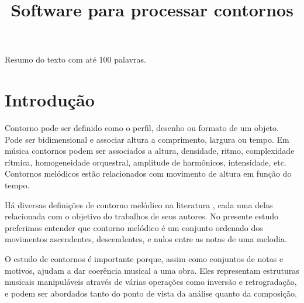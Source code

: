 \documentclass[brazil]{article}
\begin{document}
\graphicspath{{figs/}{out/}{data/}}

\title{Software para processar contornos}
\author{}{}{}{}

\begin{sumario}
  Resumo do texto com até 100 palavras.  
\end{sumario}








\section{Introdução}
\label{sec:introducao}

Contorno pode ser definido como o perfil, desenho ou formato de um
objeto. Pode ser bidimensional e associar altura a comprimento,
largura ou tempo. Em música contornos podem ser associados a altura,
densidade, ritmo, complexidade rítmica, homogeneidade orquestral,
amplitude de harmônicos, intensidade, etc. Contornos melódicos estão
relacionados com movimento de altura em função do tempo.

Há diversas definições de contorno melódico na literatura
\cite{piston59:harmony,toch77:shaping,schonberg:fundamentals,adams76:melodic,marvin.ea87:relating,morris87:composition,clifford95:contour,beard03:contour},
cada uma delas relacionada com o objetivo do trabalhos de seus
autores. No presente estudo preferimos entender que contorno melódico
é um conjunto ordenado dos movimentos ascendentes, descendentes, e
nulos entre as notas de uma melodia.


O estudo de contornos é importante porque, assim como conjuntos de
notas e motivos, ajudam a dar coerência musical a uma obra. Eles
representam estruturas musicais manipuláveis através de várias
operações como inversão e retrogradação, e podem ser abordados tanto
do ponto de vista da análise quanto da composição.
\end{document}
